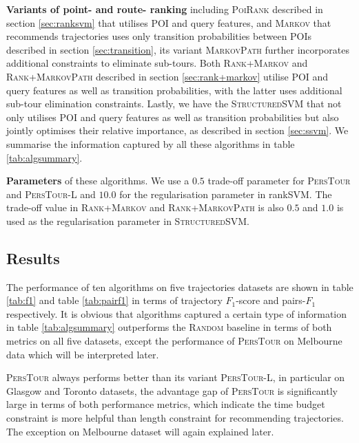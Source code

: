 {\bf Variants of point- and route- ranking} including \textsc{PoiRank} described in section \ref{sec:ranksvm}
that utilises POI and query features, and \textsc{Markov} that recommends trajectories uses only transition 
probabilities between POIs described in section \ref{sec:transition}, its variant \textsc{MarkovPath} 
further incorporates additional constraints to eliminate sub-tours.
Both \textsc{Rank+Markov} and \textsc{Rank+MarkovPath} described in section \ref{sec:rank+markov} 
utilise POI and query features as well as transition probabilities, with the latter uses
additional sub-tour elimination constraints.
Lastly, we have the \textsc{StructuredSVM} that not only utilises POI and query features as well as 
transition probabilities but also jointly optimises their relative importance, as described in section \ref{sec:ssvm}.
We summarise the information captured by all these algorithms in table \ref{tab:algsummary}.

{\bf Parameters} of these algorithms.
We use a $0.5$ trade-off parameter for \textsc{PersTour} and \textsc{PersTour-L}
and $10.0$ for the regularisation parameter in rankSVM.
The trade-off value in \textsc{Rank+Markov} and \textsc{Rank+MarkovPath} is also $0.5$
and $1.0$ is used as the regularisation parameter in \textsc{StructuredSVM}.


\subsection{Results}
\label{sec:result}

The performance of ten algorithms on five trajectories datasets are shown in table \ref{tab:f1}
and table \ref{tab:pairf1} in terms of trajectory $F_1$-score and pairs-$F_1$ respectively.
%
It is obvious that algorithms captured a certain type of information in table \ref{tab:algsummary}
outperforms the \textsc{Random} baseline in terms of both metrics on all five datasets, 
except the performance of \textsc{PersTour}\cite{ijcai15} on Melbourne data which will be interpreted later.

\textsc{PersTour}\cite{ijcai15} always performs better than its variant \textsc{PersTour-L}, 
in particular on Glasgow and Toronto datasets, the advantage gap of \textsc{PersTour}
is significantly large in terms of both performance metrics,
%
which indicate the time budget constraint is more helpful than length constraint for recommending trajectories.
The exception on Melbourne dataset will again explained later.

